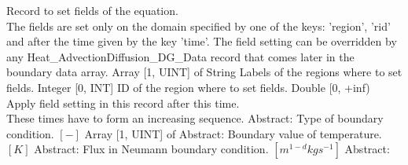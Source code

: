 \begin{RecordType}
	{}
	{} %
	{} %
	{} %
	{{{Record to set fields of the equation.}\\{
The fields are set only on the domain specified by one of the keys: 'region', 'rid'}\\{
and after the time given by the key 'time'. The field setting can be overridden by}\\{
 any Heat{\_}AdvectionDiffusion{\_}DG{\_}Data record that comes later in the boundary data array.}}}
		\KeyItem
			{}
			{{Array [1, UINT] of }{String}}
			{\textrangle}
			{} %
			{{{Labels of the regions where to set fields. }}}
		\KeyItem
			{}
			{{Integer [0, INT]}}
			{\textrangle}
			{} %
			{{{ID of the region where to set fields.}}}
		\KeyItem
			{}
			{{Double [0, +inf)}}
			{\textrangle}
			{} %
			{{{Apply field setting in this record after this time.}\\{
These times have to form an increasing sequence.}}}
		\KeyItem
			{}
			{{Abstract}{: }}
			{\textrangle}
			{} %
			{{{Type of boundary condition. }{$[-]$}}}
		\KeyItem
			{}
			{{Array [1, UINT] of }{Abstract}{: }}
			{\textrangle}
			{} %
			{{{Boundary value of temperature. }{$[K]$}}}
		\KeyItem
			{}
			{{Abstract}{: }}
			{\textrangle}
			{} %
			{{{Flux in Neumann boundary condition. }{$[m^{1-d}kgs^{-1}]$}}}
		\KeyItem
			{}
			{{Abstract}{: }}

\end{RecordType}
